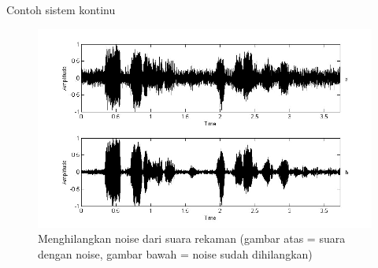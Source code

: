 \documentclass[pdflatex,compress,mathserif]{beamer}
\begin{document}
\begin{frame}{Contoh sistem kontinu}
	\begin{figure}
		\centering
		\includegraphics[height=0.7\textheight]{img/00.proses_sinyal_kontinu}
		\caption{Menghilangkan noise dari suara rekaman (gambar atas = suara dengan noise, gambar bawah = noise sudah dihilangkan)}
	\end{figure}
\end{frame}
\end{document}
